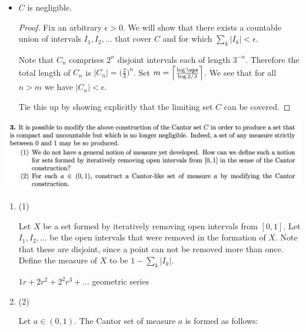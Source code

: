 \begin{itemize}
\begin{proof}
  \end{proof}

\item \begin{claim*}
    $C$ is negligible.
  \end{claim*}

  \begin{proof}
    Fix an arbitrary $\epsilon > 0$. We will show that there exists a countable union of
    intervals $I_1, I_2, \ldots$ that cover $C$ and for which $\sum_k |I_k| < \epsilon$.

    Note that $C_n$ comprises $2^n$ disjoint intervals each of length $3^{-n}$. Therefore the total length
    of $C_n$ is $|C_n| = \big(\frac{2}{3}\big)^n$. Set $m = \Big\lceil\frac{\log\eps}{\log 2/3} \Big\rceil$. We see that for all $n > m$ we have $|C_n| < \epsilon$.




     Tie this up by showing explicitly that the limiting set $C$ can be covered.
  \end{proof}

\end{itemize}


\begin{mdframed}
  \includegraphics[width=400pt]{img/analysis--berkeley-202a-6b7a.png}
\end{mdframed}

\begin{enumerate}[label=(3.\arabic*)]

\item (1)
  \begin{definition*}
    Let $X$ be a set formed by iteratively removing open intervals from $[0, 1]$. Let $I_1, I_2, \ldots$ be the
    open intervals that were removed in the formation of $X$. Note that these are disjoint, since a point can
    not be removed more than once. Define the measure of $X$ to be $1 - \sum_k |I_k|$.

    $1r + 2r^2 + 2^2r^3 + \ldots$ geometric series
  \end{definition*}

\item (2)
  \begin{definition}
    Let $a \in (0, 1)$. The Cantor set of measure $a$ is formed as follows:

  \end{definition}

\end{enumerate}




